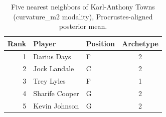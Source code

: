 \begin{table}[htbp]
  \centering\small
  \begin{tabular}{rllc}
    \toprule
    Rank & Player & Position & Archetype \\
    \midrule
    1 & Darius Days & F & 2 \\
    2 & Jock Landale & C & 2 \\
    3 & Trey Lyles & F & 1 \\
    4 & Sharife Cooper & G & 2 \\
    5 & Kevin Johnson & G & 2 \\
    \bottomrule
  \end{tabular}
  \caption{Five nearest neighbors of Karl-Anthony Towns (curvature_m2 modality), Procrustes-aligned posterior mean.}
  \label{tab:Karl_Anthony_Towns_neighbors_curvature_m2}
\end{table}

